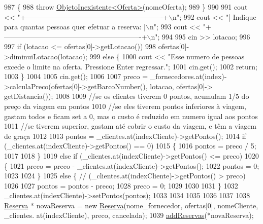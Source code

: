 \begin{DoxyCode}
987     \{
988         \textcolor{keywordflow}{throw} \hyperlink{classObjetoInexistente}{ObjetoInexistente<Oferta>}(nomeOferta);
989     \}
990 
991     cout << \textcolor{stringliteral}{"+----------------------------------------------------------+\(\backslash\)n"};
992     cout << \textcolor{stringliteral}{"| Indique para quantas pessoas quer efetuar a reserva:     |\(\backslash\)n"};
993     cout << \textcolor{stringliteral}{"+----------------------------------------------------------+\(\backslash\)n"};
994 
995     cin >> lotacao;
996 
997     \textcolor{keywordflow}{if} (lotacao <= ofertas[0]->getLotacao())
998         ofertas[0]->diminuiLotacao(lotacao);
999     \textcolor{keywordflow}{else} \{
1000         cout << \textcolor{stringliteral}{"Esse numero de pessoas excede o limite na oferta. Pressione Enter regressar."};
1001         cin.get();
1002         \textcolor{keywordflow}{return};
1003     \}
1004 
1005     cin.get();
1006 
1007     preco = \_fornecedores.at(index)->calculaPreco(ofertas[0]->getBarcoNumber(), lotacao, ofertas[0]->
      getDistancia());
1008 
1009     \textcolor{comment}{//se os clientes tiverem 0 pontos, acumulam 1/5 do preço da viagem em pontos}
1010     \textcolor{comment}{//se eles tiverem pontos inferiores à viagem, gastam todos e ficam set a 0, mas o custo é reduzido em
       numero igual aos pontos}
1011     \textcolor{comment}{//se tiverem superior, gastam até cobrir o custo da viagem, e têm a viagem de graça}
1012 
1013     pontos = \_clientes.at(indexCliente)->getPontos();
1014         \textcolor{keywordflow}{if} (\_clientes.at(indexCliente)->getPontos() == 0)
1015         \{
1016             pontos = preco / 5;
1017             
1018         \}
1019         \textcolor{keywordflow}{else} \textcolor{keywordflow}{if} (\_clientes.at(indexCliente)->getPontos() <= preco)
1020         \{
1021             preco = preco - \_clientes.at(indexCliente)->getPontos();
1022             pontos = 0;
1023             
1024         \}
1025         \textcolor{keywordflow}{else} \{ \textcolor{comment}{// (\_clientes.at(indexCliente)->getPontos() > preco)}
1026             
1027             pontos = pontos - preco;
1028             preco = 0;
1029             
1030             
1031         \}
1032         \_clientes.at(indexCliente)->setPontos(pontos);
1033         
1034     
1035     
1036     
1037 
1038     \hyperlink{classReserva}{Reserva} * novaReserva = \textcolor{keyword}{new} \hyperlink{classReserva}{Reserva}(nome\_fornecedor, ofertas[0], nomeCliente, \_clientes.
      at(indexCliente), preco, cancelada);
1039     \hyperlink{classEmpresa_a42a1671b234ab8380cfb2ed33517edb2}{addReservas}(*novaReserva);  

\end{DoxyCode}

